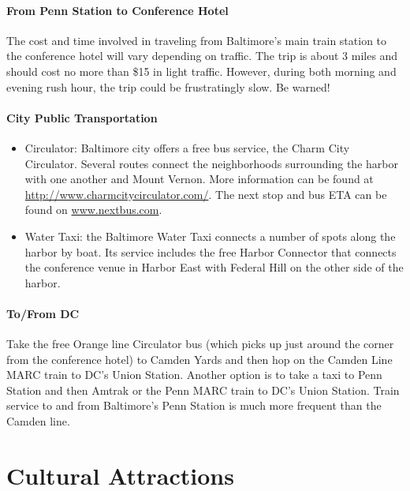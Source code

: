\paragraph*{From Penn Station to Conference Hotel}
The cost and time involved in traveling from Baltimore's main train station to the conference hotel will vary depending on traffic. The trip is about 3 miles and should cost no more than \$15 in light traffic. However, during both morning and evening rush hour, the trip could be frustratingly slow. Be warned!

\paragraph*{City Public Transportation}
\begin{itemize}
\item{Circulator: Baltimore city offers a free bus service, the Charm City Circulator. Several routes connect the neighborhoods surrounding the harbor with one another and Mount Vernon. More information can be found at \url{http://www.charmcitycirculator.com/}. The next stop and bus ETA can be found on \url{www.nextbus.com}.}
\item{Water Taxi: the Baltimore Water Taxi connects a number of spots along the harbor by boat. Its service includes the free Harbor Connector that connects the conference venue in Harbor East with Federal Hill on the other side of the harbor.}
\end{itemize}

\paragraph*{To/From DC}
Take the free Orange line Circulator bus (which picks up just around
the corner from the conference hotel) to Camden Yards and then hop on
the Camden Line MARC train to DC's Union Station. Another option is to
take a taxi to Penn Station and then Amtrak or the Penn MARC train to DC's Union Station. Train
service to and from Baltimore's Penn Station is much more frequent than the Camden line.

\section{Cultural Attractions}

